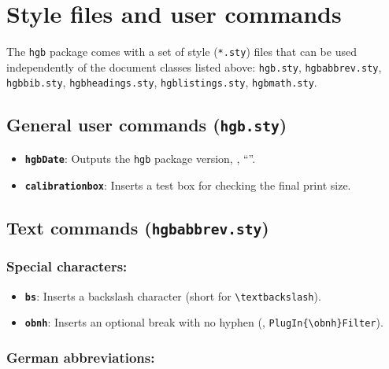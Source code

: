 \documentclass[english]{hgbarticle}
\begin{document}
\section{Style files and user commands}

The \texttt{hgb} package comes with a set of style (\texttt{*.sty}) files that can be used
independently of the document classes listed above:
\texttt{hgb.sty},
\texttt{hgbabbrev.sty},
\texttt{hgbbib.sty},
\texttt{hgbheadings.sty},
\texttt{hgblistings.sty},
\texttt{hgbmath.sty}.


\subsection{General user commands (\texttt{hgb.sty})}


\begin{itemize}
\item \textbf{\texttt{{\bs}hgbDate}}: Outputs the \texttt{hgb} package version, 
		\eg, ``\texttt{\hgbDate}''.
\item \textbf{\texttt{{\bs}calibrationbox}}: Inserts a test box for checking the final print size.
\end{itemize}



\subsection{Text commands (\texttt{hgbabbrev.sty})}

\subsubsection*{Special characters:}

\begin{itemize}
\item \textbf{\texttt{{\bs}bs}}: Inserts a backslash character (short for \verb!\textbackslash!).
\item \textbf{\texttt{{\bs}obnh}}: Inserts an optional break with no hyphen (\eg, \verb!PlugIn{\obnh}Filter!).
\end{itemize}



\subsubsection*{German abbreviations:}
\end{document}
